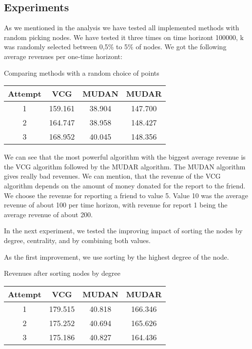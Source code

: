 \documentclass[conference]{IEEEtran}
\begin{document}
\subsection{Experiments}
As we mentioned in the analysis we have tested all implemented methods with random picking nodes. We have tested it three times on time horizont 100000, k was randomly selected between 0,5\% to 5\% of nodes. We got the following average revenues per one-time horizont:

\begin{center}
	Comparing methods with a random choice of points
	\vspace{10pt}
   \begin{tabular}{|c|c|c|c|}
        \hline
        Attempt & VCG & MUDAN & MUDAR \\
        \hline
        1 & 159.161 & 38.904 & 147.700 \\
        \hline
        2 & 164.747 & 38.958 & 148.427 \\
        \hline
        3 & 168.952 & 40.045 & 148.356 \\
        \hline
    \end{tabular}

\end{center}

We can see that the most powerful algorithm with the biggest average revenue is the VCG algorithm followed by the MUDAR algorithm. The MUDAN algorithm gives really bad revenues. We can mention, that the revenue of the VCG algorithm depends on the amount of money donated for the report to the friend. We choose the revenue for reporting a friend to value 5. Value 10 was the average revenue of about 100 per time horizon, with revenue for report 1 being the average revenue of about 200. 

In the next experiment, we tested the improving impact of sorting the nodes by degree, centrality, and by combining both values. 

As the first improvement, we use sorting by the highest degree of the node.
\begin{center}
	Revenues after sorting nodes by degree
	\vspace{10pt}
   \begin{tabular}{|c|c|c|c|}
        \hline
        Attempt & VCG & MUDAN & MUDAR \\
        \hline
        1 & 179.515 & 40.818 & 166.346 \\
        \hline
        2 & 175.252 & 40.694 & 165.626 \\
        \hline
        3 & 175.186 & 40.827 & 164.436 \\
        \hline
    \end{tabular}
\end{center}
\end{document}

